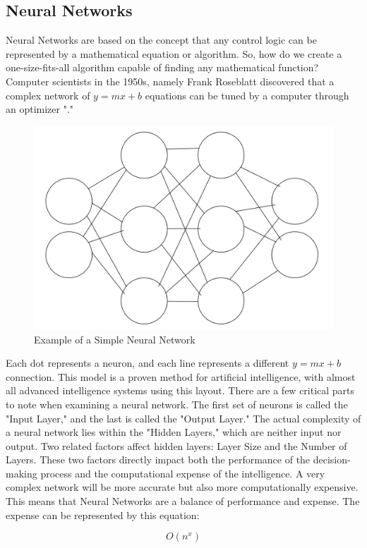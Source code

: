 \subsection*{Neural Networks}

Neural Networks are based on the concept that any control logic can be represented by a mathematical equation or algorithm. So, how do we create a one-size-fits-all algorithm capable of finding any mathematical function? Computer scientists in the 1950s, namely Frank Roseblatt discovered that a complex network of \(y = mx + b\) equations can be tuned by a computer through an optimizer "\cite{3b1b_1}."

\begin{figure}[H]
    \centering
    \includegraphics[width=0.7\linewidth]{images/NueralExample.jpg}
    \caption{Example of a Simple Neural Network}
    \label{Example of Simple Neural Network}
\end{figure}

Each dot represents a neuron, and each line represents a different \(y = mx + b\) connection. This model is a proven method for artificial intelligence, with almost all advanced intelligence systems using this layout. There are a few critical parts to note when examining a neural network. The first set of neurons is called the "Input Layer," and the last is called the "Output Layer." The actual complexity of a neural network lies within the "Hidden Layers," which are neither input nor output. Two related factors affect hidden layers: Layer Size and the Number of Layers. These two factors directly impact both the performance of the decision-making process and the computational expense of the intelligence. A very complex network will be more accurate but also more computationally expensive. This means that Neural Networks are a balance of performance and expense. The expense can be represented by this equation:

\[O(n^x)\]

